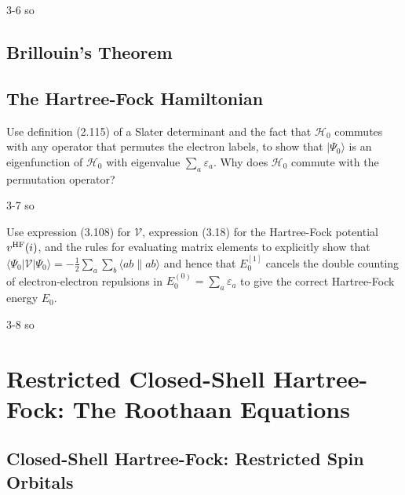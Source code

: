 \documentclass[a4paper]{book}
\newcommand\lr[2]{\langle#1\|#2\rangle}
\newcommand{\HF}{{\rm HF}}
\begin{document}
	\begin{solution}
		3-6 so
	\end{solution}
	
	\subsection{Brillouin's Theorem}
	
	\subsection{The Hartree-Fock Hamiltonian}
	
	\begin{exercise}
	Use definition (2.115) of a Slater determinant and the fact that $\mathscr{H}_0$ commutes with any operator that permutes the electron labels, to show that $|\Psi_0\rangle$ is an eigenfunction of $\mathscr{H}_0$ with eigenvalue $\displaystyle \sum_a \varepsilon_a$. Why does $\mathscr{H}_0$ commute with the permutation operator?
	\end{exercise}
	
	\begin{solution}
		3-7 so
	\end{solution}
	
	\begin{exercise}
	Use expression (3.108) for $\mathscr{V}$, expression (3.18) for the Hartree-Fock potential $v^{\HF}(i)$, and the rules for evaluating matrix elements to explicitly show that $\displaystyle \langle \Psi_0 | \mathscr{V} | \Psi_0 \rangle = -\frac{1}{2} \sum_a \sum_b \lr{ab}{ab}$ and hence that $E^{[1]}_0$ cancels the double counting of electron-electron repulsions in $\displaystyle E^{(0)}_0=\sum_a \varepsilon_a$ to give the correct Hartree-Fock energy $E_0$.
	\end{exercise}
	
	\begin{solution}
		3-8 so
	\end{solution}
	
	\section{Restricted Closed-Shell Hartree-Fock: The Roothaan Equations}
	
	\subsection{Closed-Shell Hartree-Fock: Restricted Spin Orbitals}
	
\end{document}
